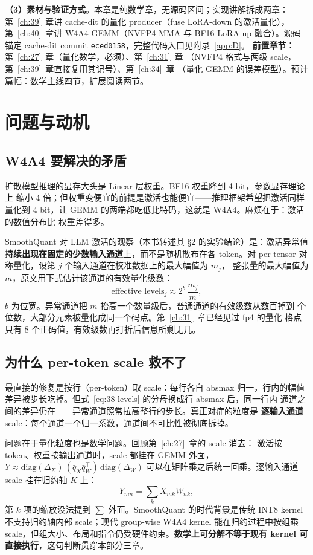 \textbf{（3）素材与验证方式}。本章是纯数学章，无源码区间；实现讲解拆成两章：
第~\ref{ch:39}~章讲 cache-dit 的量化 producer（fuse LoRA-down 的激活量化），
第~\ref{ch:40}~章讲 W4A4 GEMM（NVFP4 MMA 与 BF16 LoRA-up 融合）。源码锚定
cache-dit commit \texttt{eced0158}，完整代码入口见附录~\ref{app:D}。
\textbf{前置章节}：第~\ref{ch:27}~章（量化数学，必须）、第~\ref{ch:31}~章
（NVFP4 格式与两级 scale，第~\ref{ch:39}~章直接复用其记号）、第~\ref{ch:34}~章
（量化 GEMM 的误差模型）。预计篇幅：数学主线四节，扩展阅读两节。

\section{问题与动机}

\subsection{W4A4 要解决的矛盾}

扩散模型推理的显存大头是 Linear 层权重。BF16 权重降到 4 bit，参数显存理论上
缩小 4 倍；但权重变便宜的前提是激活也能便宜——推理框架希望把激活同样量化到
4 bit，让 GEMM 的两端都吃低比特码，这就是 W4A4。麻烦在于：激活的数值分布比
权重差得多。

SmoothQuant 对 LLM 激活的观察（本书转述其 §2 的实验结论）是：激活异常值
\textbf{持续出现在固定的少数输入通道}上，而不是随机散布在各 token。对
per-tensor 对称量化，设第 $j$ 个输入通道在校准数据上的最大幅值为 $m_j$，
整张量的最大幅值为 $m$，原文用下式估计该通道的有效量化级数：
\begin{equation}
  \text{effective levels}_j \approx 2^{b}\,\frac{m_j}{m},
  \label{eq:38-levels}
\end{equation}
$b$ 为位宽。异常通道把 $m$ 抬高一个数量级后，普通通道的有效级数从数百掉到
个位数，大部分元素被量化成同一个码点。第~\ref{ch:31}~章已经见过 fp4 的量化
格点只有 8 个正码值，有效级数再打折后信息所剩无几。

\subsection{为什么 per-token scale 救不了}

最直接的修复是按行（per-token）取 scale：每行各自 absmax 归一，行内的幅值
差异被步长吃掉。但式~\ref{eq:38-levels} 的分母换成行 absmax 后，同一行内
通道之间的差异仍在——异常通道照常拉高整行的步长。真正对症的粒度是
\textbf{逐输入通道} scale：每个通道一个归一系数，通道间不可比性被彻底拆掉。

问题在于量化粒度也是数学问题。回顾第~\ref{ch:27}~章的 scale 消去：
激活按 token、权重按输出通道时，scale 都挂在 GEMM 外面，
$Y\approx\mathrm{diag}(\Delta_X)\,(\bar q_X\bar q_W^{\top})\,\mathrm{diag}(\Delta_W)$
可以在矩阵乘之后统一回乘。逐输入通道 scale 挂在归约轴 $K$ 上：
\begin{equation}
  Y_{mn}=\sum_{k}X_{mk}W_{nk},
  \label{eq:38-reduce}
\end{equation}
第 $k$ 项的缩放没法提到 $\sum$ 外面。SmoothQuant 的时代背景是传统 INT8 kernel
不支持归约轴内部 scale；现代 group-wise W4A4 kernel 能在归约过程中按组乘
scale，但组大小、布局和指令仍受硬件约束。\textbf{数学上可分解不等于现有 kernel
可直接执行}，这句判断贯穿本部分三章。

